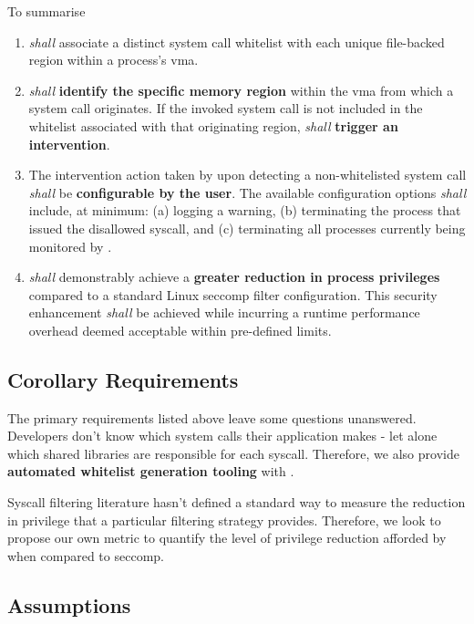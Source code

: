To summarise 

\begin{enumerate}
    \item \af \textit{shall} associate a distinct system call whitelist with each unique file-backed region within a process's \ac{vma}.
    \item \af \textit{shall} \textbf{identify the specific memory region} within the \ac{vma} from which a system call originates. If the invoked system call is not included in the whitelist associated with that originating region, \af \textit{shall} \textbf{trigger an intervention}.
    \item The intervention action taken by \af upon detecting a non-whitelisted system call \textit{shall} be \textbf{configurable by the user}. The available configuration options \textit{shall} include, at minimum: (a) logging a warning, (b) terminating the process that issued the disallowed syscall, and (c) terminating all processes currently being monitored by \af.
    \item \af \textit{shall} demonstrably achieve a \textbf{greater reduction in process privileges} compared to a standard Linux seccomp filter configuration. This security enhancement \textit{shall} be achieved while incurring a runtime performance overhead deemed acceptable within pre-defined limits.
\end{enumerate}

\subsection{Corollary Requirements} \label{subsubsec:corollary-reqs}

The primary requirements listed above leave some questions unanswered.
Developers don't know which system calls their application makes - let alone
which shared libraries are responsible for each syscall. Therefore, we also
provide \textbf{automated whitelist generation tooling} with \af. 

Syscall filtering literature hasn't defined a standard way to measure the
reduction in privilege that a particular filtering strategy provides. Therefore,
we look to propose our own metric to quantify the level of privilege reduction
afforded by \af when compared to seccomp.

\subsection{Assumptions}\label{subsec:assumptions}

